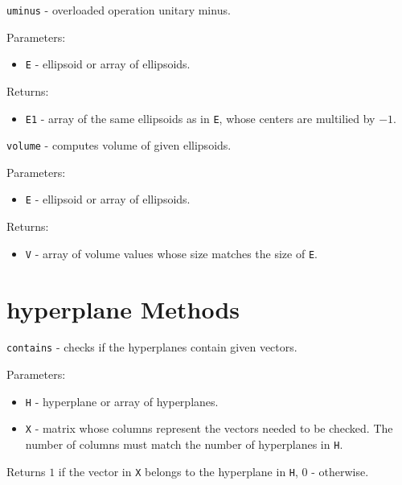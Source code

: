 \documentclass{report}
\begin{document}


\newpage


{\Large {\tt uminus}} - overloaded operation unitary minus.

Parameters:
\begin{itemize}
\item {\tt E} - ellipsoid or array of ellipsoids.
\end{itemize}

Returns:
\begin{itemize}
\item {\tt E1} - array of the same ellipsoids as in {\tt E}, whose centers
are multilied by $-1$.
\end{itemize}



\newpage

{\Large {\tt volume}} - computes volume of given ellipsoids.

Parameters:
\begin{itemize}
\item {\tt E} - ellipsoid or array of ellipsoids.
\end{itemize}

Returns:
\begin{itemize}
\item {\tt V} - array of volume values whose size matches the size of {\tt E}.
\end{itemize}


\newpage

\section{hyperplane Methods}
{\Large {\tt contains}} - checks if the hyperplanes contain given vectors.

Parameters:
\begin{itemize}
\item {\tt H} - hyperplane or array of hyperplanes.
\item {\tt X} - matrix whose columns represent the vectors needed to be checked.
The number of columns must match the number of hyperplanes in {\tt H}.
\end{itemize}

Returns $1$ if the vector in {\tt X} belongs to the hyperplane in {\tt H},
$0$ - otherwise.
\end{document}
